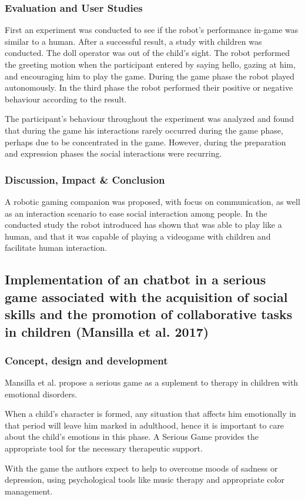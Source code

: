\documentclass[runningheads]{llncs}
\begin{document}
\subsubsection{Evaluation and User Studies}
\par First an experiment was conducted to see if the robot's performance in-game was similar to a human. After a successful result, a study with children was conducted. The doll operator was out of the child's sight. The robot performed the greeting motion when the participant entered by saying hello, gazing at him, and encouraging him to play the game. During the game phase the robot played autonomously. In the third phase the robot performed their positive or negative behaviour according to the result.
\par The participant's behaviour throughout the experiment was analyzed and found that during the game his interactions rarely occurred during the game phase, perhaps due to be concentrated in the game. However, during the preparation and expression phases the social interactions were recurring.

\subsubsection{Discussion, Impact \& Conclusion}
\par A robotic gaming companion was proposed, with focus on communication, as well as an interaction scenario to ease social interaction among people. In the conducted study the robot introduced has shown that was able to play like a human, and that it was capable of playing a videogame with children and facilitate human interaction.


\subsection{Implementation of an chatbot in a serious game associated with the acquisition of social skills and the promotion of collaborative tasks in children (Mansilla et al. 2017)}

\subsubsection{Concept, design and development}
\par Mansilla et al. propose a serious game as a suplement to therapy in children with emotional disorders.
\par When a child's character is formed, any situation that affects him emotionally in that period will leave him marked in adulthood, hence it is important to care about the child's emotions in this phase. A Serious Game provides the appropriate tool for the necessary therapeutic support.
\par With the game the authors expect to help to overcome moods of sadness or depression, using psychological tools like music therapy and appropriate color management.
\end{document}
